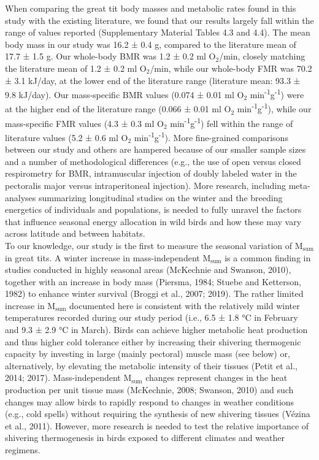 \documentclass[10pt, twoside]{book} %
\begin{document}
When comparing the great tit body masses and metabolic rates found in this study with the existing literature, we found that our results largely fall within the range of values reported (Supplementary Material Tables 4.3 and 4.4). The mean body mass in our study was 16.2 ± 0.4 g, compared to the literature mean of 17.7 ± 1.5 g. Our whole-body BMR was 1.2 ± 0.2 ml O$_{\text{2}}$/min, closely matching the literature mean of 1.2 ± 0.2 ml O$_{\text{2}}$/min, while our whole-body FMR was 70.2 ± 3.1 kJ/day, at the lower end of the literature range (literature mean: 93.3 ± 9.8 kJ/day). Our mass-specific BMR values (0.074 ± 0.01 ml O$_{\text{2}}$ min\textsuperscript{-1}g\textsuperscript{-1}) were at the higher end of the literature range (0.066 ± 0.01 ml O$_{\text{2}}$ min\textsuperscript{-1}g\textsuperscript{-1}), while our mass-specific FMR values (4.3 ± 0.3 ml O$_{\text{2}}$ min\textsuperscript{-1}g\textsuperscript{-1}) fell within the range of literature values (5.2 ± 0.6 ml O$_{\text{2}}$ min\textsuperscript{-1}g\textsuperscript{-1}). More fine-grained comparisons between our study and others are hampered because of our smaller sample sizes and a number of methodological differences (e.g., the use of open versus closed respirometry for BMR, intramuscular injection of doubly labeled water in the pectoralis major versus intraperitoneal injection). More research, including meta-analyses summarizing longitudinal studies on the winter and the breeding energetics of individuals and populations, is needed to fully unravel the factors that influence seasonal energy allocation in wild birds and how these may vary across latitude and between habitats.\\

To our knowledge, our study is the first to measure the seasonal variation of M$_{\text{sum}}$ in great tits. A winter increase in mass-independent M$_{\text{sum}}$ is a common finding in studies conducted in highly seasonal areas (McKechnie and Swanson, 2010), together with an increase in body mass (Piersma, 1984; Stuebe and Ketterson, 1982) to enhance winter survival (Broggi et al., 2007; 2019). The rather limited increase in M$_{\text{sum}}$ documented here is consistent with the relatively mild winter temperatures recorded during our study period (i.e., 6.5 ± 1.8 °C in February and 9.3 ± 2.9 °C in March). Birds can achieve higher metabolic heat production and thus higher cold tolerance either by increasing their shivering thermogenic capacity by investing in large (mainly pectoral) muscle mass (see below) or, alternatively, by elevating the metabolic intensity of their tissues (Petit et al., 2014; 2017). Mass-independent M$_{\text{sum}}$ changes represent changes in the heat production per unit tissue mass (McKechnie, 2008; Swanson, 2010) and such changes may allow birds to rapidly respond to changes in weather conditions (e.g., cold spells) without requiring the synthesis of new shivering tissues (Vézina et al., 2011). However, more research is needed to test the relative importance of shivering thermogenesis in birds exposed to different climates and weather regimens.
\end{document}
